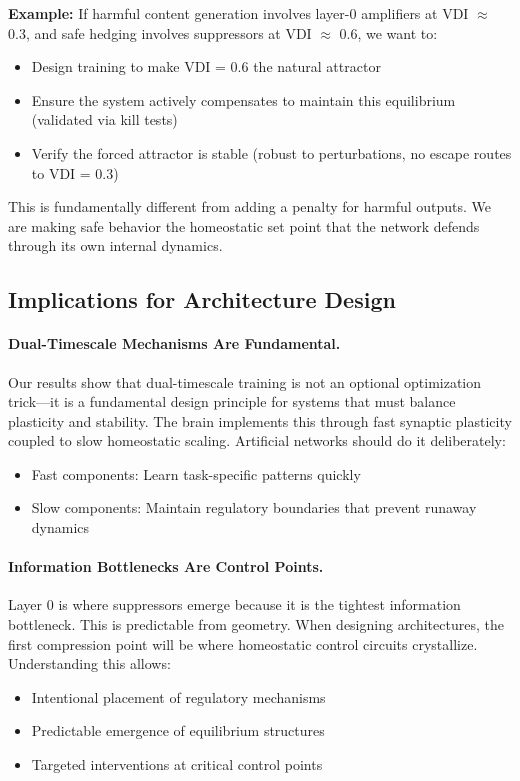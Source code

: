 \textbf{Example:} If harmful content generation involves layer-0 amplifiers at VDI $\approx$ 0.3, and safe hedging involves suppressors at VDI $\approx$ 0.6, we want to:
\begin{itemize}
\item Design training to make VDI = 0.6 the natural attractor
\item Ensure the system actively compensates to maintain this equilibrium (validated via kill tests)
\item Verify the forced attractor is stable (robust to perturbations, no escape routes to VDI = 0.3)
\end{itemize}

This is fundamentally different from adding a penalty for harmful outputs. We are making safe behavior the homeostatic set point that the network defends through its own internal dynamics.

\subsection{Implications for Architecture Design}

\paragraph{Dual-Timescale Mechanisms Are Fundamental.}
Our results show that dual-timescale training is not an optional optimization trick—it is a fundamental design principle for systems that must balance plasticity and stability. The brain implements this through fast synaptic plasticity coupled to slow homeostatic scaling. Artificial networks should do it deliberately:
\begin{itemize}
\item Fast components: Learn task-specific patterns quickly
\item Slow components: Maintain regulatory boundaries that prevent runaway dynamics
\end{itemize}

\paragraph{Information Bottlenecks Are Control Points.}
Layer 0 is where suppressors emerge because it is the tightest information bottleneck. This is predictable from geometry. When designing architectures, the first compression point will be where homeostatic control circuits crystallize. Understanding this allows:
\begin{itemize}
\item Intentional placement of regulatory mechanisms
\item Predictable emergence of equilibrium structures
\item Targeted interventions at critical control points
\end{itemize}

